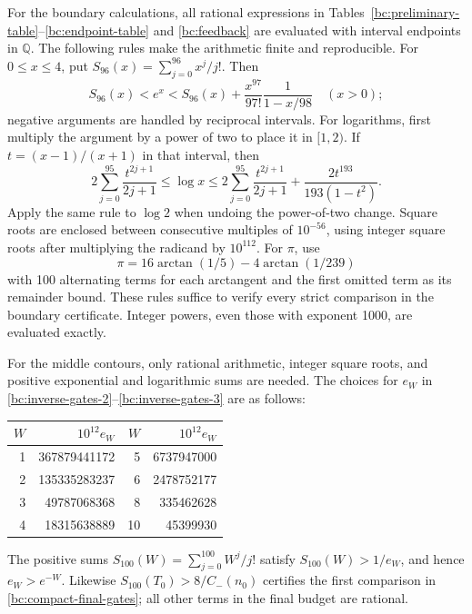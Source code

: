 \documentclass[11pt,reqno]{amsart}
\numberwithin{equation}{section}
\theoremstyle{definition}
\theoremstyle{remark}
\begin{document}
For the boundary calculations, all rational expressions in
Tables~\ref{bc:preliminary-table}--\ref{bc:endpoint-table} and
\eqref{bc:feedback} are evaluated with interval endpoints in $\mathbb Q$.
The following rules make the arithmetic finite and reproducible.
For $0\leq x\leq4$, put $S_{96}(x)=\sum_{j=0}^{96}x^j/j!$.
Then
\[
 S_{96}(x)<e^x<
 S_{96}(x)+\frac{x^{97}}{97!}\frac1{1-x/98}
 \quad(x>0);
\]
negative arguments are handled by reciprocal intervals.
For logarithms, first multiply the argument by a power of two to
place it in $[1,2)$.  If $t=(x-1)/(x+1)$ in that interval, then
\[
 2\sum_{j=0}^{95}\frac{t^{2j+1}}{2j+1}
 \leq\log x\leq
 2\sum_{j=0}^{95}\frac{t^{2j+1}}{2j+1}
 +\frac{2t^{193}}{193(1-t^2)}.
\]
Apply the same rule to $\log2$ when undoing the power-of-two change.
Square roots are enclosed between consecutive multiples of $10^{-56}$,
using integer square roots after multiplying the radicand by $10^{112}$.
For $\pi$, use
\[
 \pi=16\arctan(1/5)-4\arctan(1/239)
\]
with 100 alternating terms for each arctangent and the first omitted
term as its remainder bound.  These rules suffice to verify every
strict comparison in the boundary certificate.  Integer powers, even
those with exponent 1000, are evaluated exactly.

For the middle contours, only rational arithmetic, integer square
roots, and positive exponential and logarithmic sums are needed.
The choices for $e_W$ in \eqref{bc:inverse-gates-2}--\eqref{bc:inverse-gates-3}
are as follows:
\begin{center}\small
\begin{tabular}{@{}rrrr@{}}\toprule
$W$&$10^{12}e_W$&$W$&$10^{12}e_W$\\\midrule
1&367879441172&5&6737947000\\
2&135335283237&6&2478752177\\
3&49787068368&8&335462628\\
4&18315638889&10&45399930\\\bottomrule
\end{tabular}
\end{center}
The positive sums $S_{100}(W)=\sum_{j=0}^{100}W^j/j!$ satisfy
$S_{100}(W)>1/e_W$, and hence $e_W>e^{-W}$.
Likewise $S_{100}(T_0)>8/C_-(n_0)$ certifies the first comparison
in \eqref{bc:compact-final-gates}; all other terms in the final
budget are rational.
\end{document}
